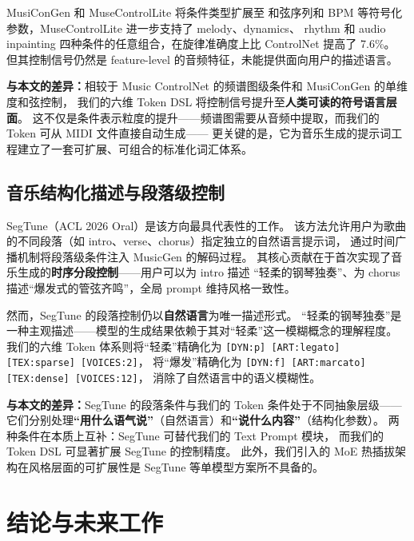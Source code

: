 MusiConGen\cite{musecong} 和 MuseControlLite\cite{muselite} 将条件类型扩展至
和弦序列和 BPM 等符号化参数，MuseControlLite 进一步支持了 melody、dynamics、
rhythm 和 audio inpainting 四种条件的任意组合，在旋律准确度上比 ControlNet 提高了 7.6\%。
但其控制信号仍然是 feature-level 的音频特征，未能提供面向用户的描述语言。

\textbf{与本文的差异：}相较于 Music ControlNet 的频谱图级条件和 MusiConGen 的单维度和弦控制，
我们的六维 Token DSL 将控制信号提升至\textbf{人类可读的符号语言层面}。
这不仅是条件表示粒度的提升——频谱图需要从音频中提取，而我们的 Token 可从 MIDI 文件直接自动生成——
更关键的是，它为音乐生成的提示词工程建立了一套可扩展、可组合的标准化词汇体系。

\subsection{音乐结构化描述与段落级控制}

SegTune\cite{segtune}（ACL 2026 Oral）是该方向最具代表性的工作。
该方法允许用户为歌曲的不同段落（如 intro、verse、chorus）指定独立的自然语言提示词，
通过时间广播机制将段落级条件注入 MusicGen 的解码过程。
其核心贡献在于首次实现了音乐生成的\textbf{时序分段控制}——用户可以为 intro 描述
“轻柔的钢琴独奏”、为 chorus 描述“爆发式的管弦齐鸣”，全局 prompt 维持风格一致性。

然而，SegTune 的段落控制仍以\textbf{自然语言}为唯一描述形式。
“轻柔的钢琴独奏”是一种主观描述——模型的生成结果依赖于其对“轻柔”这一模糊概念的理解程度。
我们的六维 Token 体系则将“轻柔”精确化为 \texttt{[DYN:p] [ART:legato] [TEX:sparse] [VOICES:2]}，
将“爆发”精确化为 \texttt{[DYN:f] [ART:marcato] [TEX:dense] [VOICES:12]}，
消除了自然语言中的语义模糊性。

\textbf{与本文的差异：}SegTune 的段落条件与我们的 Token 条件处于不同抽象层级——
它们分别处理\textbf{“用什么语气说”}（自然语言）和\textbf{“说什么内容”}（结构化参数）。
两种条件在本质上互补：SegTune 可替代我们的 Text Prompt 模块，
而我们的 Token DSL 可显著扩展 SegTune 的控制精度。
此外，我们引入的 MoE 热插拔架构在风格层面的可扩展性是 SegTune 等单模型方案所不具备的。

\section{结论与未来工作}


